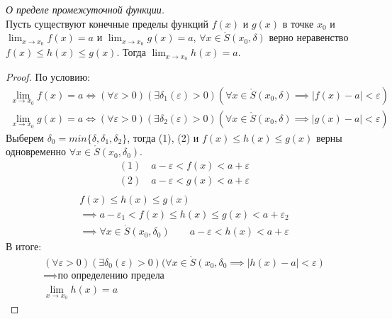 \begin{theorem}
  \textit{О пределе промежуточной функции.} \\
  Пусть существуют конечные пределы функций $f(x)$ и $g(x)$ в точке  $x_0$ и $\lim_{x \to x_0} f(x) = a$ и $\lim_{x \to x_0} g(x) = a$, $\forall x \in \mathring{S}(x_0, \delta)$ верно неравенство $f(x) \le h(x) \le g(x)$. Тогда $\lim_{x \to x_0} h(x) = a$.
\end{theorem}
\begin{proof}
  По условию: 
  \begin{gather*}
    \lim_{x \to x_0} f(x) = a \iff (\forall \varepsilon > 0)(\exists \delta_1(\varepsilon) > 0)(\forall x \in \mathring{S}(x_0, \delta) \implies |f(x) - a| < \varepsilon) \tag{1} \\
    \lim_{x \to x_0} g(x) = a \iff (\forall \varepsilon > 0)(\exists \delta_2(\varepsilon) > 0)(\forall x \in \mathring{S}(x_0, \delta) \implies |g(x) - a| < \varepsilon) \tag{2}
  \end{gather*}
  Выберем $\delta_0 = min \{\delta, \delta_1, \delta_2\}$, тогда (1), (2) и $f(x) \le h(x) \le g(x)$ верны одновременно $\forall x \in \mathring{S}(x_0, \delta_0)$.
  \begin{align*}
    (1) \quad a - \varepsilon < f(x) < a + \varepsilon \\
    (2) \quad a - \varepsilon < g(x) < a + \varepsilon \\
  \end{align*}
  \begin{gather*}
    f(x) \le h(x) \le g(x) \\
    \implies a - \varepsilon_1 < f(x) \le h(x) \le g(x) < a + \varepsilon_2 \\
    \implies \forall x \in \mathring{S}(x_0, \delta_0) \qquad a - \varepsilon < h(x) < a + \varepsilon
  \end{gather*}
  В итоге:
  \begin{gather*}
    (\forall \varepsilon > 0)(\exists \delta_0(\varepsilon) > 0)(\forall x \in \mathring{S}(x_0, \delta_0 \implies |h(x) - a| < \varepsilon) \\
    \implies \text{по определению предела} \\
    \lim_{x \to x_0} h(x) = a
  \end{gather*}
\end{proof}

